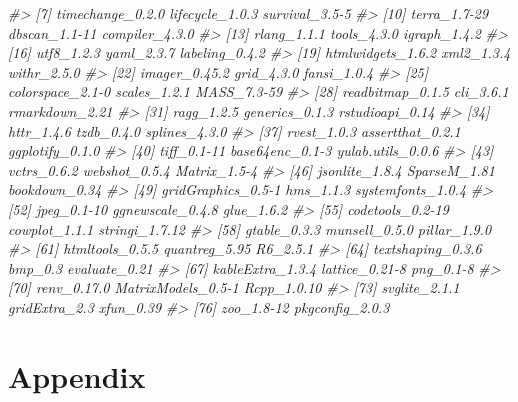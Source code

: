\documentclass[11pt,]{isuthesis}
\newenvironment{Shaded}{\begin{snugshade}}{\end{snugshade}}
\newcommand{\CommentTok}[1]{\textcolor[rgb]{0.56,0.35,0.01}{\textit{#1}}}
\begin{document}
\begin{Shaded}
\begin{Highlighting}[]
\CommentTok{\#\textgreater{}  [7] timechange\_0.2.0   lifecycle\_1.0.3    survival\_3.5{-}5    }
\CommentTok{\#\textgreater{} [10] terra\_1.7{-}29       dbscan\_1.1{-}11      compiler\_4.3.0    }
\CommentTok{\#\textgreater{} [13] rlang\_1.1.1        tools\_4.3.0        igraph\_1.4.2      }
\CommentTok{\#\textgreater{} [16] utf8\_1.2.3         yaml\_2.3.7         labeling\_0.4.2    }
\CommentTok{\#\textgreater{} [19] htmlwidgets\_1.6.2  xml2\_1.3.4         withr\_2.5.0       }
\CommentTok{\#\textgreater{} [22] imager\_0.45.2      grid\_4.3.0         fansi\_1.0.4       }
\CommentTok{\#\textgreater{} [25] colorspace\_2.1{-}0   scales\_1.2.1       MASS\_7.3{-}59       }
\CommentTok{\#\textgreater{} [28] readbitmap\_0.1.5   cli\_3.6.1          rmarkdown\_2.21    }
\CommentTok{\#\textgreater{} [31] ragg\_1.2.5         generics\_0.1.3     rstudioapi\_0.14   }
\CommentTok{\#\textgreater{} [34] httr\_1.4.6         tzdb\_0.4.0         splines\_4.3.0     }
\CommentTok{\#\textgreater{} [37] rvest\_1.0.3        assertthat\_0.2.1   ggplotify\_0.1.0   }
\CommentTok{\#\textgreater{} [40] tiff\_0.1{-}11        base64enc\_0.1{-}3    yulab.utils\_0.0.6 }
\CommentTok{\#\textgreater{} [43] vctrs\_0.6.2        webshot\_0.5.4      Matrix\_1.5{-}4      }
\CommentTok{\#\textgreater{} [46] jsonlite\_1.8.4     SparseM\_1.81       bookdown\_0.34     }
\CommentTok{\#\textgreater{} [49] gridGraphics\_0.5{-}1 hms\_1.1.3          systemfonts\_1.0.4 }
\CommentTok{\#\textgreater{} [52] jpeg\_0.1{-}10        ggnewscale\_0.4.8   glue\_1.6.2        }
\CommentTok{\#\textgreater{} [55] codetools\_0.2{-}19   cowplot\_1.1.1      stringi\_1.7.12    }
\CommentTok{\#\textgreater{} [58] gtable\_0.3.3       munsell\_0.5.0      pillar\_1.9.0      }
\CommentTok{\#\textgreater{} [61] htmltools\_0.5.5    quantreg\_5.95      R6\_2.5.1          }
\CommentTok{\#\textgreater{} [64] textshaping\_0.3.6  bmp\_0.3            evaluate\_0.21     }
\CommentTok{\#\textgreater{} [67] kableExtra\_1.3.4   lattice\_0.21{-}8     png\_0.1{-}8         }
\CommentTok{\#\textgreater{} [70] renv\_0.17.0        MatrixModels\_0.5{-}1 Rcpp\_1.0.10       }
\CommentTok{\#\textgreater{} [73] svglite\_2.1.1      gridExtra\_2.3      xfun\_0.39         }
\CommentTok{\#\textgreater{} [76] zoo\_1.8{-}12         pkgconfig\_2.0.3}
\end{Highlighting}
\end{Shaded}

\newpage

\setcounter{section}{0}
\renewcommand{\thesection}{\Alph{section}}

\hypertarget{appendix}{%
\chapter*{Appendix}\label{appendix}}
\end{document}
